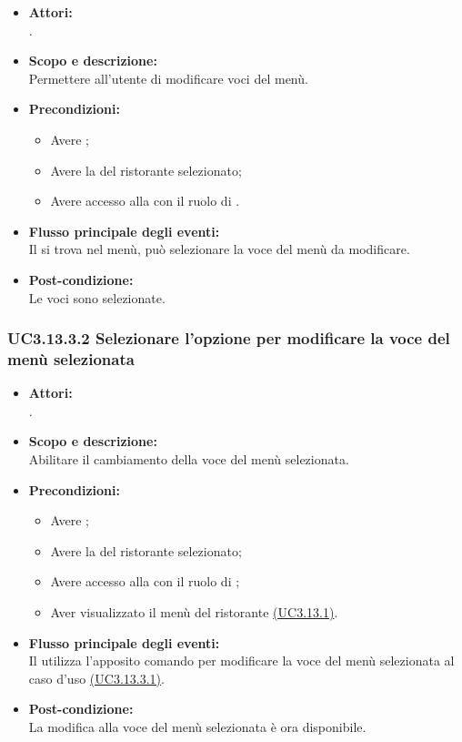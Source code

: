 \begin{itemize}
	\item \textbf{Attori:}
	\\.
	\item \textbf{Scopo e descrizione:} 
	\\Permettere all'utente  di modificare voci del menù.
	\item \textbf{Precondizioni:}
	\begin{itemize}
		\item Avere ;
		\item Avere la  del ristorante selezionato;
		\item Avere accesso alla  con il ruolo di .
	\end{itemize}
	\item \textbf{Flusso principale degli eventi:}
	\\Il {} si trova nel menù, può selezionare la voce del menù da modificare.
	\item \textbf{Post-condizione:}
	\\Le voci sono selezionate.
\end{itemize}

\subsubsection{UC3.13.3.2 Selezionare l'opzione per modificare la voce del menù selezionata} \label{UC3.13.3.2}

\begin{itemize}
	\item \textbf{Attori:}
	\\.
	\item \textbf{Scopo e descrizione:} 
	\\Abilitare il cambiamento della voce del menù selezionata.
	\item \textbf{Precondizioni:}
	\begin{itemize}
		\item Avere ;
		\item Avere la  del ristorante selezionato;
		\item Avere accesso alla  con il ruolo di ;
		\item Aver visualizzato il menù del ristorante \hyperref[UC3.13.1]{(UC3.13.1)}.
	\end{itemize}
	\item \textbf{Flusso principale degli eventi:}
	\\Il {} utilizza l'apposito comando per modificare la voce del menù selezionata al caso d'uso \hyperref[UC3.13.3.1]{(UC3.13.3.1)}.
	\item \textbf{Post-condizione:}
	\\La modifica alla voce del menù selezionata è ora disponibile.
\end{itemize}

